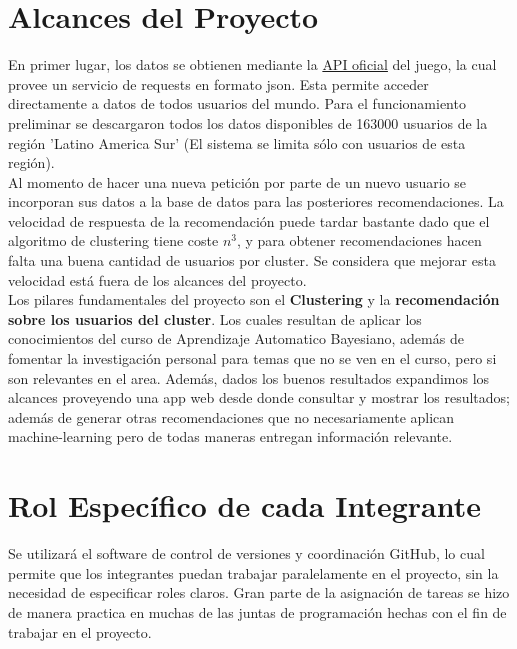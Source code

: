 \documentclass[letterpaper,11pt, spanish]{article}
\begin{document}
\section{Alcances del Proyecto}


En primer lugar, los datos se obtienen mediante la \href{https://developer.riotgames.com/}{API oficial}
del juego, la cual provee un servicio de requests en formato json. Esta permite
acceder directamente a datos de todos usuarios del mundo. Para el funcionamiento preliminar se descargaron todos los datos disponibles de 163000 usuarios de la región 'Latino America Sur' (El sistema se limita sólo con usuarios de esta región). \\

Al momento de hacer una nueva petición por parte de un nuevo usuario se incorporan sus datos a la base de datos para las posteriores recomendaciones. La velocidad de respuesta de la recomendación puede tardar bastante dado que el algoritmo de clustering tiene coste $n^3$, y para obtener recomendaciones hacen falta una buena cantidad de usuarios por cluster. Se considera que mejorar esta velocidad está fuera de los alcances del proyecto. \\

Los pilares fundamentales del proyecto son el \textbf{Clustering} y la \textbf{recomendación sobre los usuarios del cluster}. Los cuales resultan de aplicar los conocimientos del curso de Aprendizaje Automatico Bayesiano, además de fomentar la investigación personal para temas que no se ven en el curso, pero si son relevantes en el area. Además, dados los buenos resultados expandimos los alcances proveyendo una app web desde donde consultar y mostrar los resultados; además de generar otras recomendaciones que no necesariamente aplican machine-learning pero de todas maneras entregan información relevante. 

\newpage
\section{Rol Específico de cada Integrante}

Se utilizará el software de control de versiones y coordinación GitHub, lo cual
permite que los integrantes puedan trabajar paralelamente en el proyecto, sin
la necesidad de especificar roles claros. Gran parte de la asignación de tareas se hizo de manera practica en muchas de las juntas de programación hechas con el fin de trabajar en el proyecto.\\
\end{document}
